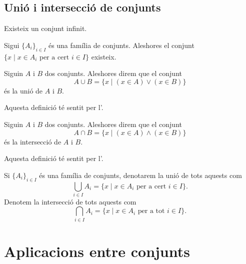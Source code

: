 \documentclass[../Apunts.tex]{subfiles}
\begin{document}
	\subsection{Unió i intersecció de conjunts}
	\begin{axiom}
		Existeix un conjunt infinit.
	\end{axiom}
	\begin{axiom}
		\label{axiom:axioma de la unió}
		Sigui \(\{A_{i}\}_{i\in I}\) és una família de conjunts. Aleshores el conjunt \(\{x\mid x\in A_{i}\text{ per a cert }i\in I\}\) existeix.
	\end{axiom}
	\begin{definition}
		\label{def:unió de conjunts}
		Siguin \(A\) i \(B\) dos conjunts. Aleshores direm que el conjunt
		\[A\cup B=\{x\mid(x\in A)\lor(x\in B)\}\]
		és la unió de \(A\) i \(B\).
		
		Aquesta definició té sentit per l'.
	\end{definition}
	\begin{definition}
		\label{def:intersecció de conjunts}
		Siguin \(A\) i \(B\) dos conjunts. Aleshores direm que el conjunt
		\[A\cap B=\{x\mid(x\in A)\land(x\in B)\}\]
		és la intersecció de \(A\) i \(B\).
		
		Aquesta definició té sentit per l'.
	\end{definition}
	\begin{notation}
		Si \(\{A_{i}\}_{i\in I}\) és una família de conjunts, denotarem la unió de tots aquests com
		\[\bigcup_{i\in I}A_{i}=\{x\mid x\in A_{i}\text{ per a cert }i\in I\}.\]
		Denotem la intersecció de tots aquests com
		\[\bigcap_{i\in I}A_{i}=\{x\mid x\in A_{i}\text{ per a tot }i\in I\}.\]
	\end{notation}
	\section{Aplicacions entre conjunts}
\end{document}
